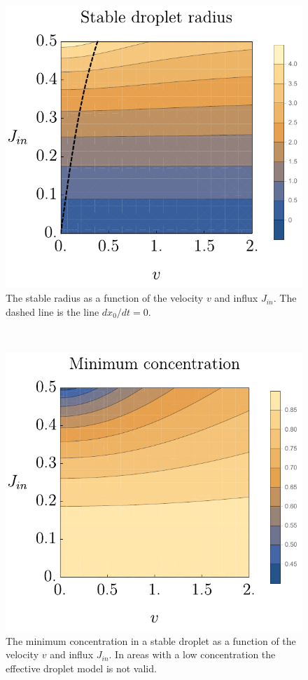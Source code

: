 \documentclass{Dissertate}
\let\origfigure\figure
\let\endorigfigure\endfigure
\renewenvironment{figure}[1][2] {
    \expandafter\origfigure\expandafter[H]
} {
    \endorigfigure
}
\begin{document}
\begin{figure}
    \centering
    \begin{subfigure}[t]{0.5\textwidth}
        \centering
        \includegraphics{source/figures/pdf/Stable_nodecay.pdf}
        \caption{The stable radius as a function of the velocity \(v\) and
influx \(J_{in}\). The dashed line is the line
\(dx_0/dt=0\).\label{fig:stableradnodecay}}
    \end{subfigure}%
    ~ 
    \begin{subfigure}[t]{0.5\textwidth}
        \centering
        \includegraphics{source/figures/pdf/minimumconcentration.pdf}
        \caption{The minimum concentration in a stable droplet as a function of the velocity \(v\) and influx \(J_{in}\). In areas with a low
concentration the effective droplet model is not valid.
        \label{fig:minconnodecay}}
    \end{subfigure}
    \caption{}
\end{figure}
\end{document}
